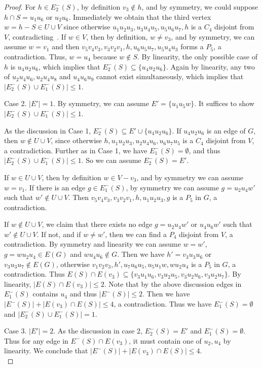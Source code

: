 \documentclass[a4paper]{article}
\newcommand{\emphd}[1]{{\fontseries{b}\selectfont\textsf{#1}}}
\begin{document}
\begin{proof}
    For $h \in E_2^-(S)$, by definition $v_3\notin h$, and by symmetry, we could suppose $h\cap S=u_1u_6$ or $u_2u_6$. Immediately we obtain that the third vertex $w= h-S\in U\cup V$ since otherwise $u_1u_2u_3,u_3u_4u_5,u_5u_6u_7,h$ is a $C_4$ disjoint from $V$, contradicting~. If $w\in V$, then by definition, $w\neq v_3$, and by symmetry, we can assume $w=v_1$ and then $v_5v_4v_3,v_3v_2v_1,h,u_6u_5u_7,u_5u_4u_3$ forms a $P_5$, a contradiction. Thus, $w=u_4$ because $w\notin S$. By linearity, the only possible case of $h$ is $u_4u_2u_6$, which implies that $E_2^-(S)\subseteq\{u_4u_2u_6\}$. Again by linearity, any two of $u_2u_4u_6,u_2u_4u_8$ and $u_4u_6u_9$ cannot exist simultaneously, which implies that $|E_2^-(S)\cup E_1^-(S)|\le 1$. 

	\emphd{Case 2.} $|E'|=1$. By symmetry, we can assume $E'=\{u_1 u_5 w\}$. It suffices to show $|E_2^-(S)\cup E_1^-(S)|\le 1$.

    As the discussion in Case 1, $E_2^-(S)\subseteq E' \cup\{u_4u_2u_6\}$. If $u_4u_2u_6$ is an edge of $G$, then $w\notin U\cup V$, since otherwise $h,u_1u_2u_3,u_2u_4u_6,u_6u_7u_5$ is a $C_4$ disjoint from $V$, a contradiction. Further as in Case 1, we have $E_1^-(S)=\emptyset$, and thus $|E_2^-(S)\cup E_1^-(S)|\le 1$. So we can assume $E_2^-(S)=E'$.
    
    If $w\in U\cup V$, then by definition $w\in V-v_3$, and by symmetry we can assume $w=v_1$. If there is an edge $g\in E_1^-(S)$, by symmetry we can assume $g=u_2u_4w'$ such that $w'\notin U\cup V$. Then $v_5v_4v_3,v_3v_2v_1,h,u_1u_2u_3,g$ is a $P_5$ in $G$, a contradiction.
    
    If $w\notin U\cup V$, we claim that there exists no edge $g=u_2u_4w'$ or $u_4u_6w'$ such that $w'\notin U\cup V$. If not, and if $w\neq w'$, then we can find a $P_4$ disjoint from $V$, a contradiction. By symmetry and linearity we can assume $w=w'$, $g=wu_2u_4\in E (G)$ and $wu_4u_6\notin G$. Then we have $h'=v_3u_3u_6$ or $v_3u_3u_7 \notin E (G)$, otherwise $v_1v_2v_3,h',u_7u_6u_5,u_5u_1w,wu_2u_4$ is a $P_5$ in $G$, a contradiction. 
    Thus $E(S)\cap E(v_3)\subseteq\{v_3u_1u_6,v_3u_2u_5,v_3u_2u_6,v_3u_2u_7\}$. By linearity, $|E(S)\cap E(v_3)|\leq 2$. Note that by the above discussion edges in $E_1^-(S)$ contains $u_4$ and thus $|E^-(S)|\leq 2$. Then we have $|E^-(S)|+|E(v_3)\cap E(S)|\le 4$, a contradiction.
    Thus we have $E_1^-(S)=\emptyset$ and $|E_2^-(S)\cup E_1^-(S)|=1$.
    
	\emphd{Case 3.} $|E'|=2$. As the discussion in case 2, $E_2^-(S)=E'$ and $E_1^-(S)=\emptyset$. Thus for any edge in $E^-(S)\cap E(v_3)$, it must contain one of $u_2,u_4$ by linearity. We conclude that $|E^-(S)|+|E(v_3)\cap E(S)|\le 4$.\\
    

\end{proof}
\end{document}
